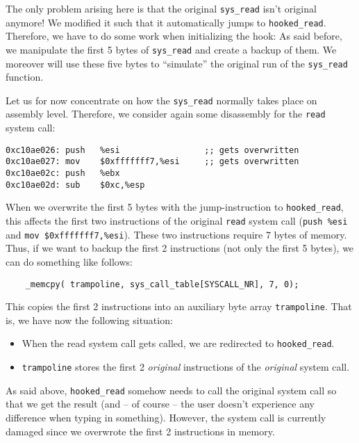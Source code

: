 \documentclass[10pt, letterpaper]{scrartcl}
\begin{document}
The only problem arising here is that the original \texttt{sys\_read} isn't original anymore! We modified it such that it automatically jumps to \texttt{hooked\_read}. Therefore, we have to do some work when initializing the hook: As said before, we manipulate the first 5 bytes of \texttt{sys\_read} and create a backup of them. We moreover will use these five bytes to ``simulate'' the original run of the \texttt{sys\_read} function.

Let us for now concentrate on how the \texttt{sys\_read} normally takes place on assembly level. Therefore, we consider again some disassembly for the \texttt{read} system call:

\begin{verbatim}
0xc10ae026:	push   %esi                 ;; gets overwritten
0xc10ae027:	mov    $0xfffffff7,%esi     ;; gets overwritten
0xc10ae02c:	push   %ebx
0xc10ae02d:	sub    $0xc,%esp
\end{verbatim}

When we overwrite the first 5 bytes with the jump-instruction to \texttt{hooked\_read}, this affects the first two instructions of the original \texttt{read} system call (\texttt{push \%esi} and \texttt{mov \$0xfffffff7,\%esi}). These two instructions require 7 bytes of memory. Thus, if we want to backup the first 2 instructions (not only the first 5 bytes), we can do something like follows:

\begin{verbatim}
    _memcpy( trampoline, sys_call_table[SYSCALL_NR], 7, 0);
\end{verbatim}

This copies the first 2 instructions into an auxiliary byte array \texttt{trampoline}. That is, we have now the following situation:

\begin{itemize}
\item When the read system call gets called, we are redirected to \texttt{hooked\_read}.
\item \texttt{trampoline} stores the first 2 \emph{original} instructions of the \emph{original} system call.
\end{itemize}

As said above, \texttt{hooked\_read} somehow needs to call the original system call so that we get the result (and -- of course -- the user doesn't experience any difference when typing in something). However, the system call is currently damaged since we overwrote the first 2 instructions in memory.
\end{document}
